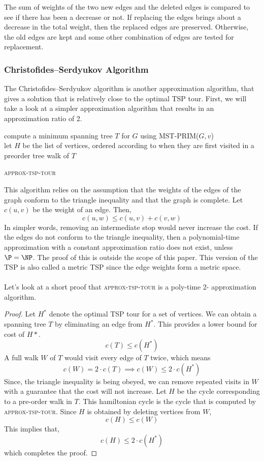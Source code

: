 \documentclass[11pt]{article}
\begin{document}
    The sum of weights of the two new edges and the deleted edges is compared to see if there has been a decrease or not. If replacing the edges brings about a decrease in the total weight, then the replaced edges are preserved. Otherwise, the old edges are kept and some other combination of edges are tested for replacement.
    \newpage
    \subsubsection {Christofides–Serdyukov Algorithm}
    The Christofides–Serdyukov algorithm is another approximation algorithm, that gives a solution that is 
    relatively close to the optimal TSP tour. First, we will take a look at a simpler approximation 
    algorithm that results in an approximation ratio of 2.

    \begin{algorithm*}
      compute a minimum spanning tree $T$ for $G$ using \textsc{MST-PRIM}($G, v$) \\
      let $H$ be the list of vertices, ordered according to when they are first visited in a
      preorder tree walk of $T$ \\
  \caption{\textsc{approx-tsp-tour}}
  \end{algorithm*}
    
  This algorithm relies on the assumption that the weights of the edges of the graph conform to the triangle inequality and that the graph is complete.
  Let $c(u,v)$ be the weight of 
  an edge. Then, \[c(u,w) \leq c(u,v) + c(v, w) \]
  In simpler words, removing an intermediate stop would never increase the cost. If the edges do not conform to the triangle inequality, then a polynomial-time approximation
  with a constant approximation ratio does not exist, unless $\P = \NP$. The proof of this
  is outside the scope of this paper. This version of the TSP is also called a metric TSP since 
  the edge weights form a metric space.   
  \paragraph{} Let's look at a short proof that \textsc{approx-tsp-tour} is a poly-time 2- approximation algorithm. 
  \begin{proof}
    Let $H^*$ denote the optimal TSP tour for a set of vertices. We can obtain a spanning tree $T$ by eliminating an edge from 
    $H^*$. This provides a lower bound for cost of $H*$. 
    \[c(T) \leq c(H^*)\] A full walk $W$ of $T$ would visit every edge of $T$ twice, which means   
    \[c(W) = 2\cdot c(T) \implies c(W) \leq 2\cdot c(H^*)\]
  Since, the triangle inequality is being obeyed, we can remove repeated visits in $W$ with a guarantee that 
  the cost will not increase.
  Let $H$ be the cycle corresponding to a pre-order walk in $T$. This hamiltonian cycle is the cycle that is computed by 
  \textsc{approx-tsp-tour}. Since $H$ is obtained by deleting vertices from $W$,
  \[c(H) \leq c(W)\]
  This implies that, \[c(H) \leq 2\cdot c(H^*)\] which completes the proof. 
  \end{proof}
\end{document}
